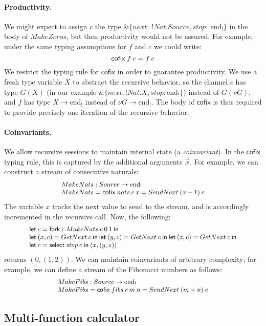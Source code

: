 \documentclass[orivec,envcountsame]{llncs}
\makeatletter
\newcommand{\with}{\mathbin\binampersand}
\newcommand{\uto}{\ensuremath{\rightarrow}}
\newcommand{\outterm}{\mathrm{end}_!}
\newcommand{\mkwd}[1]{\mathsf{#1}}
\newcommand{\clabel}[1]{\mathit{#1}}
\newcommand{\gvselect}[2]{\mkwd{select}\:#1\:#2}
\newcommand{\gvfork}[2]{\mkwd{fork}\:#1.#2}
\newcommand{\lrkwd}{\mkwd{cofix}}
\newcommand{\gvfix}[3]{\lrkwd\:#1\:#2 = #3}
\newcommand{\key}{\mkwd}
\newcommand{\cofix}{\lrkwd}
\newcommand{\ba}{\begin{array}}
\newcommand{\ea}{\end{array}}
\newcommand{\bl}{\ba[t]{@{}l@{}}}
\newcommand{\el}{\ea}
\makeatother
\begin{document}
\paragraph{Productivity.}
We might expect to assign $c$ the type $\with \{\clabel{next}:\:!Nat.Source, \clabel{stop}:\:\outterm
\}$ in the body of $MakeZeros$, but then productivity would not be assured. For example, under the
same typing assumptions for $f$ and $c$ we could write:
\[\small
\cofix\:f\:c = f\:c
\]
%
We restrict the typing rule for $\cofix$ in order to guarantee productivity. We use a fresh type
variable $X$ to abstract the recursive behavior, so the channel $c$ has type $G(X)$ (in our example
$\with \{\clabel{next}: !Nat.X, \clabel{stop}: \outterm \}$) instead of $G(\nu G)$, and $f$ has type
$X \uto \outterm$ instead of $\nu G \uto \outterm$. The body of $\cofix$ is thus required to provide
precisely one iteration of the recursive behavior.

\paragraph{Coinvariants.}

We allow recursive sessions to maintain internal state (a \emph{coinvariant}). In the $\cofix$
typing rule, this is captured by the additional arguments $\vec{x}$. For example, we can construct a
stream of consecutive naturals:
\[\small
\bl
  MakeNats : Source \uto \outterm \\
  MakeNats = \gvfix{nats}{c\:x}{SendNext\:(x + 1)\:c} \\
\el
\]
The variable $x$ tracks the next value to send to the stream, and is accordingly incremented in the
recursive call. Now, the following:
\[\small
\bl
\key{let}\:c = \gvfork{c}{MakeNats\:c\:0\:1}\:\key{in} \\
\key{let}\:(x, c) = GetNext\:c\:\key{in}\:
\key{let}\:(y, c) = GetNext\:c\:\key{in}\:
\key{let}\:(z, c) = GetNext\:c\:\key{in} \\
\key{let}\:c = \gvselect{\clabel{stop}}{c}\:\key{in}\:(x,(y,z)) \\
\el
\]
returns $(0, (1, 2))$.
%
We can maintain coinvariants of arbitrary complexity; for example, we can define a
stream of the Fibonacci numbers as follows:
\[\small
\bl
  MakeFibs : Source \uto \outterm \\
  MakeFibs = \gvfix{fibs}{c\:m\:n}{SendNext\:(m + n)\:c} \\
\el
\]

\subsection{Multi-function calculator}
\end{document}
